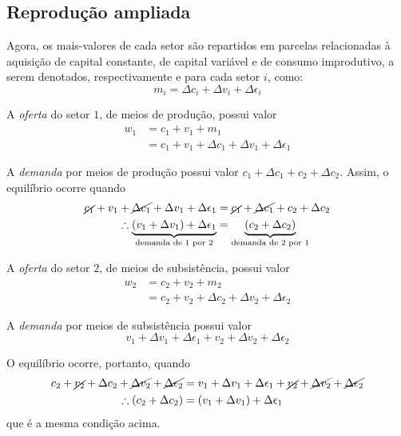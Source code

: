 \subsection{Reprodução ampliada}
Agora, os mais-valores de cada setor são repartidos em parcelas relacionadas à aquisição de capital constante, de capital variável e de consumo improdutivo, a serem denotados, respectivamente e para cada setor $i$, como:
$$
m_{i} = \Delta c_{i} + \Delta v_{i} + \Delta \epsilon_{i}
$$

A \emph{oferta} do setor $1$, de meios de produção, possui valor 
\begin{align*}
    w_{1} &= c_{1}+v_{1}+m_{1}\\
    &= c_{1}+v_{1}+\Delta c_{1}+\Delta v_{1}+\Delta \epsilon_{1}
\end{align*}


A \emph{demanda} por meios de produção possui valor $c_{1}+\Delta c_{1}+c_{2}+\Delta c_{2}$. Assim, o equilíbrio ocorre quando 
\begin{align*}
\cancel{ c_{1} } + v_{1} + \cancel{ \Delta c_{1} }+ \Delta v_{1} +\Delta \epsilon_{1} &= \cancel{ c_{1} }+\cancel{ \Delta c_{1} }+c_{2}+\Delta c_{2} \\
\therefore \underbrace{ (v_{1} + \Delta v_{1}) + \Delta \epsilon_{1} }_{ \text{demanda de 1 por 2} }  &=  \underbrace{(c_{2} + \Delta c_{2}) }_{ \text{demanda de 2 por 1} }
\end{align*}

A \emph{oferta} do setor $2$, de meios de subsistência, possui valor 
\begin{align*}
    w_{2} &= c_{2}+v_{2}+m_{2}\\
    &=c_{2}+v_{2}+\Delta c_{2}+\Delta v_{2}+\Delta \epsilon_{2}
\end{align*}


A \emph{demanda} por meios de subsistência possui valor 
$$
v_{1}+\Delta v_{1}+\Delta \epsilon_{1} + v_{2}+\Delta v_{2}+\Delta \epsilon_{2}
$$

O equilíbrio ocorre, portanto, quando 
\begin{align*}
c_{2}+\cancel{ v_{2} }+\Delta c_{2}+\cancel{ \Delta v_{2} }+\cancel{ \Delta \epsilon_{2} } &= v_{1}+\Delta v_{1}+\Delta \epsilon_{1} + \cancel{ v_{2} }+\cancel{ \Delta v_{2} }+\cancel{ \Delta \epsilon_{2} } \\
\therefore (c_{2} + \Delta c_{2}) &= (v_{1}+\Delta v_{1})+\Delta \epsilon_{1}
\end{align*}
que é a mesma condição acima.

